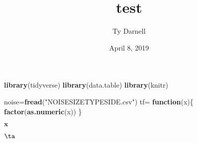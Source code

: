 \documentclass[]{tufte-handout}
\title{test}
\author{Ty Darnell}
\date{April 8, 2019}
\newenvironment{Shaded}{}{}
\newcommand{\KeywordTok}[1]{\textcolor[rgb]{0.00,0.44,0.13}{\textbf{#1}}}
\newcommand{\DataTypeTok}[1]{\textcolor[rgb]{0.56,0.13,0.00}{#1}}
\newcommand{\DecValTok}[1]{\textcolor[rgb]{0.25,0.63,0.44}{#1}}
\newcommand{\StringTok}[1]{\textcolor[rgb]{0.25,0.44,0.63}{#1}}
\newcommand{\ControlFlowTok}[1]{\textcolor[rgb]{0.00,0.44,0.13}{\textbf{#1}}}
\newcommand{\OperatorTok}[1]{\textcolor[rgb]{0.40,0.40,0.40}{#1}}
\newcommand{\NormalTok}[1]{#1}
\begin{document}
\maketitle




\begin{Shaded}
\begin{Highlighting}[]
\KeywordTok{library}\NormalTok{(tidyverse)}
\KeywordTok{library}\NormalTok{(data.table)}
\KeywordTok{library}\NormalTok{(knitr)}
\end{Highlighting}
\end{Shaded}

\begin{Shaded}
\begin{Highlighting}[]
\NormalTok{noise=}\KeywordTok{fread}\NormalTok{(}\StringTok{"NOISESIZETYPESIDE.csv"}\NormalTok{)}
\NormalTok{tf=}\StringTok{ }\ControlFlowTok{function}\NormalTok{(x)\{}
  \KeywordTok{factor}\NormalTok{(}\KeywordTok{as.numeric}\NormalTok{(x))}
\NormalTok{\}}
\end{Highlighting}
\end{Shaded}

\begin{Shaded}
\end{Shaded}

\begin{Shaded}
\end{Shaded}

\(\bm{x}\)

\(\ta\)
\end{document}
